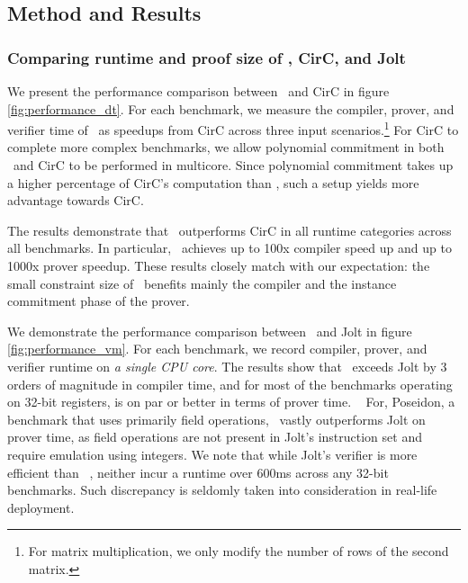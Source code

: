 \subsection{Method and Results}
\subsubsection{Comparing runtime and proof size of \CoBBl, CirC, and Jolt}




We present the performance comparison between \CoBBl~and CirC in figure \ref{fig:performance_dt}.  For each benchmark, we measure the compiler, prover, and verifier time of \CoBBl~as speedups from CirC across three input scenarios.\footnote{For matrix multiplication, we only modify the number of rows of the second matrix.} For CirC to complete more complex benchmarks, we allow polynomial commitment in both \CoBBl~and CirC to be performed in multicore. Since polynomial commitment takes up a higher percentage of CirC's computation than \CoBBl, such a setup yields more advantage towards CirC.

The results demonstrate that \CoBBl~outperforms CirC in all runtime categories across all benchmarks.  In particular, \CoBBl~achieves up to 100x compiler speed up and up to 1000x prover speedup. These results closely match with our expectation: the small constraint size of \CoBBl~benefits mainly the compiler and the instance commitment phase of the prover.

We demonstrate the performance comparison between \CoBBl~and Jolt in figure \ref{fig:performance_vm}. For each benchmark, we record compiler, prover, and verifier runtime on \emph{a single CPU core}.  The results show that \CoBBl~exceeds Jolt by 3 orders of magnitude in compiler time, and for most of the benchmarks operating on 32-bit registers, is on par or better in terms of prover time. ~ For, Poseidon, a benchmark that uses primarily field operations, \CoBBl~vastly outperforms Jolt on prover time, as field operations are not present in Jolt's instruction set and require emulation using integers. We note that while Jolt's verifier is more efficient than \CoBBl~, neither incur a runtime over 600ms across any 32-bit benchmarks. Such discrepancy is seldomly taken into consideration in real-life deployment. ~

